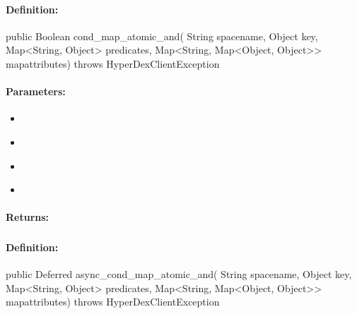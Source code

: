 \paragraph{Definition:}
\begin{javacode}
public Boolean cond_map_atomic_and(
        String spacename,
        Object key,
        Map<String, Object> predicates,
        Map<String, Map<Object, Object>> mapattributes) throws HyperDexClientException
\end{javacode}

\paragraph{Parameters:}
\begin{itemize}[noitemsep]
\item {}\\

\item {}\\

\item {}\\

\item {}\\

\end{itemize}

\paragraph{Returns:}


\pagebreak
\subsubsection{}
\label{api:java:async_cond_map_atomic_and}


\paragraph{Definition:}
\begin{javacode}
public Deferred async_cond_map_atomic_and(
        String spacename,
        Object key,
        Map<String, Object> predicates,
        Map<String, Map<Object, Object>> mapattributes) throws HyperDexClientException
\end{javacode}

